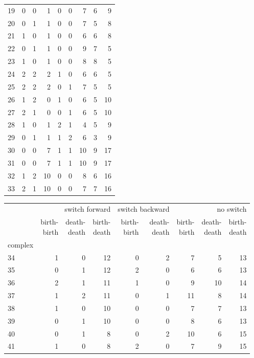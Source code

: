 \documentclass{article}
\begin{document}
\begin{center}
\begin{tabular}{lrrrrrrrr}
19 & 0 & 0 & 1 & 0 & 0 & 7 & 6 & 9 \\
20 & 0 & 1 & 1 & 0 & 0 & 7 & 5 & 8 \\
21 & 1 & 0 & 1 & 0 & 0 & 6 & 6 & 8 \\
22 & 0 & 1 & 1 & 0 & 0 & 9 & 7 & 5 \\
23 & 1 & 0 & 1 & 0 & 0 & 8 & 8 & 5 \\
24 & 2 & 2 & 2 & 1 & 0 & 6 & 6 & 5 \\
25 & 2 & 2 & 2 & 0 & 1 & 7 & 5 & 5 \\
26 & 1 & 2 & 0 & 1 & 0 & 6 & 5 & 10 \\
27 & 2 & 1 & 0 & 0 & 1 & 6 & 5 & 10 \\
28 & 1 & 0 & 1 & 2 & 1 & 4 & 5 & 9 \\
29 & 0 & 1 & 1 & 1 & 2 & 6 & 3 & 9 \\
30 & 0 & 0 & 7 & 1 & 1 & 10 & 9 & 17 \\
31 & 0 & 0 & 7 & 1 & 1 & 10 & 9 & 17 \\
32 & 1 & 2 & 10 & 0 & 0 & 8 & 6 & 16 \\
33 & 2 & 1 & 10 & 0 & 0 & 7 & 7 & 16 \\
\bottomrule
\end{tabular}

\begin{tabular}{lrrrrrrrr}
\toprule
& \multicolumn{3}{r}{switch forward} & \multicolumn{2}{r}{switch backward} & \multicolumn{3}{r}{no switch} \\
& \makecell{birth-\\birth} & \makecell{death-\\death} & \makecell{birth-\\death} & \makecell{birth-\\birth} & \makecell{death-\\death} & \makecell{birth-\\birth} & \makecell{death-\\death} & \makecell{birth-\\death} \\
complex &  &  &  &  &  &  &  &  \\
\midrule
34 & 1 & 0 & 12 & 0 & 2 & 7 & 5 & 13 \\
35 & 0 & 1 & 12 & 2 & 0 & 6 & 6 & 13 \\
36 & 2 & 1 & 11 & 1 & 0 & 9 & 10 & 14 \\
37 & 1 & 2 & 11 & 0 & 1 & 11 & 8 & 14 \\
38 & 1 & 0 & 10 & 0 & 0 & 7 & 7 & 13 \\
39 & 0 & 1 & 10 & 0 & 0 & 8 & 6 & 13 \\
40 & 0 & 1 & 8 & 0 & 2 & 10 & 6 & 15 \\
41 & 1 & 0 & 8 & 2 & 0 & 7 & 9 & 15 \\
\bottomrule
\end{tabular}

\end{center}
\end{document}
